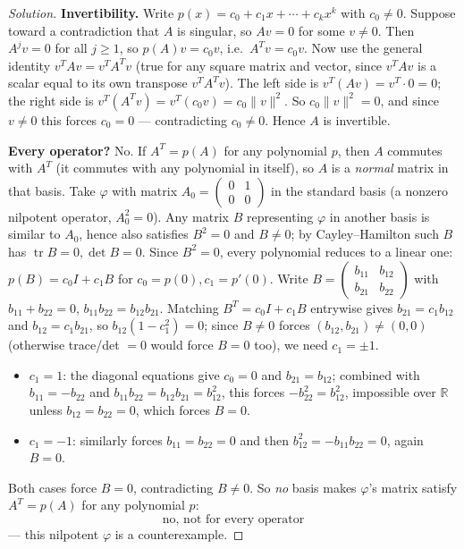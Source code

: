 \documentclass[11pt]{article}
\theoremstyle{definition}
\newcommand{\R}{\mathbb{R}}
\newcommand{\trace}{\operatorname{tr}}
\begin{document}
\begin{proof}[Solution]
\textbf{Invertibility.} Write $p(x)=c_0+c_1x+\cdots+c_kx^k$ with $c_0\neq0$. Suppose toward a contradiction that $A$ is singular, so $Av=0$ for some $v\neq0$. Then $A^jv=0$ for all $j\ge1$, so $p(A)v=c_0v$, i.e.\ $A^Tv=c_0v$. Now use the general identity $v^TAv=v^TA^Tv$ (true for any square matrix and vector, since $v^TAv$ is a scalar equal to its own transpose $v^TA^Tv$). The left side is $v^T(Av)=v^T\cdot 0=0$; the right side is $v^T(A^Tv)=v^T(c_0v)=c_0\|v\|^2$. So $c_0\|v\|^2=0$, and since $v\neq0$ this forces $c_0=0$ — contradicting $c_0\neq0$. Hence $A$ is invertible.

\textbf{Every operator?} No. If $A^T=p(A)$ for any polynomial $p$, then $A$ commutes with $A^T$ (it commutes with any polynomial in itself), so $A$ is a \emph{normal} matrix in that basis. Take $\varphi$ with matrix $A_0=\begin{pmatrix}0&1\\0&0\end{pmatrix}$ in the standard basis (a nonzero nilpotent operator, $A_0^2=0$). Any matrix $B$ representing $\varphi$ in another basis is similar to $A_0$, hence also satisfies $B^2=0$ and $B\neq0$; by Cayley–Hamilton such $B$ has $\trace B=0,\det B=0$. Since $B^2=0$, every polynomial reduces to a linear one: $p(B)=c_0I+c_1B$ for $c_0=p(0),c_1=p'(0)$. Write $B=\begin{pmatrix}b_{11}&b_{12}\\b_{21}&b_{22}\end{pmatrix}$ with $b_{11}+b_{22}=0$, $b_{11}b_{22}=b_{12}b_{21}$. Matching $B^T=c_0I+c_1B$ entrywise gives $b_{21}=c_1b_{12}$ and $b_{12}=c_1b_{21}$, so $b_{12}(1-c_1^2)=0$; since $B\neq0$ forces $(b_{12},b_{21})\neq(0,0)$ (otherwise trace/det $=0$ would force $B=0$ too), we need $c_1=\pm1$.
\begin{itemize}
\item $c_1=1$: the diagonal equations give $c_0=0$ and $b_{21}=b_{12}$; combined with $b_{11}=-b_{22}$ and $b_{11}b_{22}=b_{12}b_{21}=b_{12}^2$, this forces $-b_{22}^2=b_{12}^2$, impossible over $\R$ unless $b_{12}=b_{22}=0$, which forces $B=0$.
\item $c_1=-1$: similarly forces $b_{11}=b_{22}=0$ and then $b_{12}^2=-b_{11}b_{22}=0$, again $B=0$.
\end{itemize}
Both cases force $B=0$, contradicting $B\neq0$. So \emph{no} basis makes $\varphi$'s matrix satisfy $A^T=p(A)$ for any polynomial $p$:
\[
\boxed{\text{no, not for every operator}}
\]
— this nilpotent $\varphi$ is a counterexample.
\end{proof}
\end{document}
